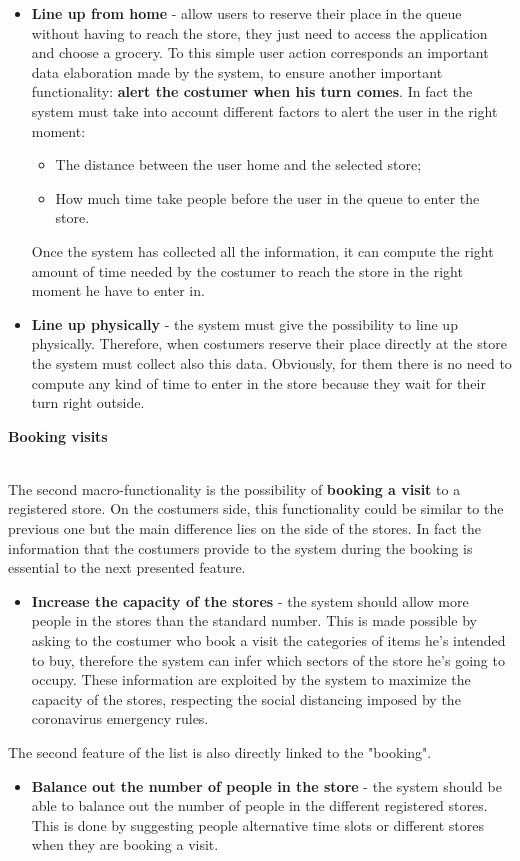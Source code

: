 \documentclass[]{article}
\begin{document}
\begin{itemize}
	\renewcommand{\labelitemi}{$-$}
	\item \textbf{Line up from home} - allow users to reserve their place in the queue without having to reach the store, they just need to access the application and choose a grocery. To this simple user action corresponds an important data elaboration made by the system, to ensure another important functionality: \textbf{alert the costumer when his turn comes}. In fact the system must take into account different factors to alert the user in the right moment:
	\begin{itemize}
		\renewcommand{\labelitemi}{$-$}
		\item The distance between the user home and the selected store;
		\item How much time take people before the user in the queue to enter the store.
	\end{itemize} 
	Once the system has collected all the information, it can compute the right amount of time needed by the costumer to reach the store in the right moment he have to enter in.
	\item \textbf{Line up physically} - the system must give the possibility to line up physically. Therefore, when costumers reserve their place directly at the store the system must collect also this data. Obviously, for them there is no need to compute any kind of time to enter in the store because they wait for their turn right outside.
\end{itemize}	
\begin{large}
	\textbf{Booking visits}
\end{large}
\smallskip
\\
The second macro-functionality is the possibility of \textbf{booking a visit} to a registered store. On the costumers side, this functionality could be similar to the previous one but the main difference lies on the side of the stores. In fact the information that the costumers provide to the system during the booking is essential to the next presented feature.
\begin{itemize}
	\renewcommand{\labelitemi}{$-$}
	\item \textbf{Increase the capacity of the stores} - the system should allow more people in the stores than the standard number. This is made possible by asking to the costumer who book a visit the categories of items he's intended to buy, therefore the system can infer which sectors of the store he's going to occupy. These information are exploited by the system to maximize the capacity of the stores, respecting the social distancing imposed by the coronavirus emergency rules.
\end{itemize}
The second feature of the list is also directly linked to the "booking".
\begin{itemize}
	\renewcommand{\labelitemi}{$-$}
	\item \textbf{Balance out the number of people in the store} - the system should be able to balance out the number of people in the different registered stores. This is done by suggesting people alternative time slots or different stores when they are booking a visit.
\end{itemize}
\end{document}
